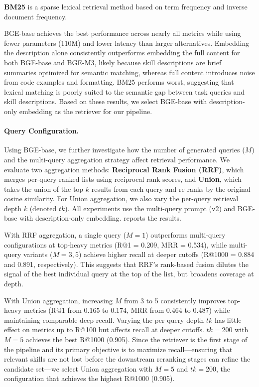 \documentclass[11pt]{article}
\begin{document}
\textbf{BM25} \citep{robertson2009probabilistic} is a sparse lexical retrieval method based on term frequency and inverse document frequency.

BGE-base achieves the best performance across nearly all metrics while using fewer parameters (110M) and lower latency than larger alternatives.
Embedding the description alone consistently outperforms embedding the full content for both BGE-base and BGE-M3, likely because skill descriptions are brief summaries optimized for semantic matching, whereas full content introduces noise from code examples and formatting.
BM25 performs worst, suggesting that lexical matching is poorly suited to the semantic gap between task queries and skill descriptions.
Based on these results, we select BGE-base with description-only embedding as the retriever for our pipeline.

\paragraph{Query Configuration.}
Using BGE-base, we further investigate how the number of generated queries ($M$) and the multi-query aggregation strategy affect retrieval performance.
We evaluate two aggregation methods: \textbf{Reciprocal Rank Fusion (RRF)}, which merges per-query ranked lists using reciprocal rank scores, and \textbf{Union}, which takes the union of the top-$k$ results from each query and re-ranks by the original cosine similarity.
For Union aggregation, we also vary the per-query retrieval depth $k$ (denoted $tk$).
All experiments use the multi-query prompt (v2) and BGE-base with description-only embedding.
 reports the results.

With RRF aggregation, a single query ($M = 1$) outperforms multi-query configurations at top-heavy metrics (R@1 = 0.209, MRR = 0.534), while multi-query variants ($M = 3, 5$) achieve higher recall at deeper cutoffs (R@1000 = 0.884 and 0.891, respectively).
This suggests that RRF's rank-based fusion dilutes the signal of the best individual query at the top of the list, but broadens coverage at depth.

With Union aggregation, increasing $M$ from 3 to 5 consistently improves top-heavy metrics (R@1 from 0.165 to 0.174, MRR from 0.464 to 0.487) while maintaining comparable deep recall.
Varying the per-query depth $tk$ has little effect on metrics up to R@100 but affects recall at deeper cutoffs. $tk = 200$ with $M = 5$ achieves the best R@1000 (0.905).
Since the retriever is the first stage of the pipeline and its primary objective is to maximize recall---ensuring that relevant skills are not lost before the downstream reranking stages can refine the candidate set---we select Union aggregation with $M = 5$ and $tk = 200$, the configuration that achieves the highest R@1000 (0.905).
\end{document}
